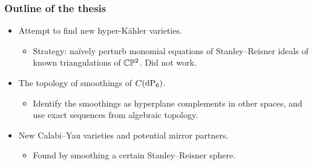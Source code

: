 \begin{frame}
\frametitle{Outline of the thesis}

\begin{itemize}
	\item Attempt to find new hyper-Kähler varieties.
	\begin{itemize}
		\item Strategy: naïvely perturb monomial equations of Stanley--Reisner ideals of known triangulations of $\mathbb{C} \mathbb{P}^2$. \pause \alert{Did not work.}
	\end{itemize} \pause
	\item The topology of smoothings of $C(\dP6)$. \pause
	\begin{itemize} \pause
		\item Identify the smoothings as hyperplane complements in other spaces, and use exact sequences from algebraic topology.
	\end{itemize} \pause
	\item New Calabi--Yau varieties and potential mirror partners.
	\begin{itemize}
		\item Found by smoothing a certain Stanley--Reisner sphere.
	\end{itemize}
\end{itemize}

\end{frame}